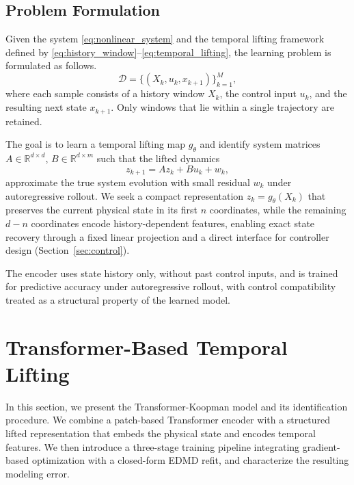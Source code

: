 \documentclass[journal]{IEEEtran}
\begin{document}
\subsection{Problem Formulation}
\label{sec:problem}

Given the system \eqref{eq:nonlinear_system} and the temporal lifting framework defined by \eqref{eq:history_window}--\eqref{eq:temporal_lifting}, the learning problem is formulated as follows.
\begin{equation}
    \mathcal{D} = \{(X_k, u_k, x_{k+1})\}_{k=1}^{M},
    \label{eq:dataset}
\end{equation}
where each sample consists of a history window $X_k$, the control input $u_k$, and the resulting next state $x_{k+1}$. Only windows that lie within a single trajectory are retained.

The goal is to learn a temporal lifting map $g_\theta$ and identify system matrices $A \in \mathbb{R}^{d\times d}$, $B \in \mathbb{R}^{d\times m}$ such that the lifted dynamics
\begin{equation}
    z_{k+1} = A z_k + B u_k + w_k,
    \label{eq:lifted_dynamics}
\end{equation}
approximate the true system evolution with small residual $w_k$ under autoregressive rollout. We seek a compact representation $z_k = g_\theta(X_k)$ that preserves the current physical state in its first $n$ coordinates, while the remaining $d-n$ coordinates encode history-dependent features, enabling exact state recovery through a fixed linear projection and a direct interface for controller design (Section~\ref{sec:control}).

The encoder uses state history only, without past control inputs, and is trained for predictive accuracy under autoregressive rollout, with control compatibility treated as a structural property of the learned model.


\section{Transformer-Based Temporal Lifting}
\label{sec:methodology}

In this section, we present the Transformer-Koopman model and its identification procedure. We combine a patch-based Transformer encoder with a structured lifted representation that embeds the physical state and encodes temporal features. We then introduce a three-stage training pipeline integrating gradient-based optimization with a closed-form EDMD refit, and characterize the resulting modeling error.
\end{document}
